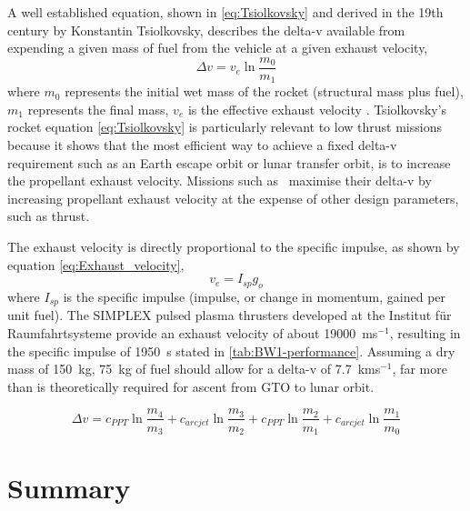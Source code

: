A well established equation, shown in \eqref{eq:Tsiolkovsky} and derived in the 19th century by Konstantin Tsiolkovsky, describes the delta-v available from expending a given mass of fuel from the vehicle at a given exhaust velocity,
\begin{equation}\label{eq:Tsiolkovsky}
\Delta v=v_{e}\ln\frac{m_{0}}{m_{1}}
\end{equation}
where $m_{0}$ represents the initial wet mass of the rocket (structural mass plus fuel), $m_{1}$ represents the final mass, $v_{e}$ is the effective exhaust velocity \parencite{Tsiolkovsky1903,Chobotov2002}. Tsiolkovsky's rocket equation \eqref{eq:Tsiolkovsky} is particularly relevant to low thrust missions because it shows that the most efficient way to achieve a fixed delta-v requirement such as an Earth escape orbit or lunar transfer orbit, is to increase the propellant exhaust velocity. Missions such as \BW\ maximise their delta-v by increasing propellant exhaust velocity at the expense of other design parameters, such as thrust.

The exhaust velocity is directly proportional to the specific impulse, as shown by equation \eqref{eq:Exhaust_velocity},
\begin{equation}\label{eq:Exhaust_velocity}
v_{e}=I_{sp}g_{o}
\end{equation}
where $I_{sp}$ is the specific impulse (impulse, or change in momentum, gained per unit fuel). The SIMPLEX pulsed plasma thrusters developed at the Institut f\"{u}r Raumfahrtsysteme \parencite{Nawaz2008} provide an exhaust velocity of about 19000~ms$^{-1}$, resulting in the specific impulse of 1950~s stated in \autoref{tab:BW1-performance}. Assuming a dry mass of 150~kg, 75~kg of fuel should allow for a delta-v of 7.7~kms$^{-1}$, far more than is theoretically required for ascent from GTO to lunar orbit.

\begin{equation}
\Delta v= c_{PPT}\ln\frac{m_4}{m_3}+c_{arcjet}\ln\frac{m_3}{m_2}+c_{PPT}\ln\frac{m_2}{m_1}+c_{arcjet}\ln\frac{m_1}{m_0}
\end{equation}


\section{Summary} 


